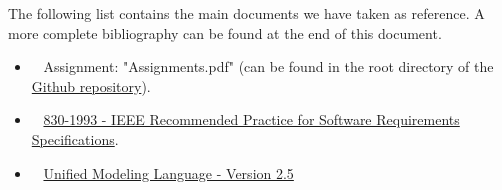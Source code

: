 The following list contains the main documents we have taken as reference. A more complete bibliography can be found at the end of this document.

\begin{itemize}
\item~ Assignment: "Assignments.pdf" (can be found in the root directory of the \href{https://github.com/TommasoBianchi/BettiBianchi_SWENG2}{Github repository}).
\item~ \href{http://ieeexplore.ieee.org/document/392555/}{830-1993 - IEEE Recommended Practice for Software Requirements Specifications}.
\item~ \href{http://www.omg.org/spec/UML/2.5/}{Unified Modeling Language - Version 2.5}
\end{itemize}